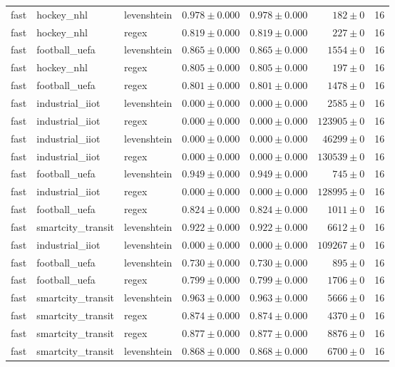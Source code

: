 \begin{table}[htbp]
\begin{tabular}{l l l r r r r}
fast & hockey\_nhl & levenshtein & $0.978\pm0.000$ & $0.978\pm0.000$ & $182\pm0$ & 16 \\
fast & hockey\_nhl & regex & $0.819\pm0.000$ & $0.819\pm0.000$ & $227\pm0$ & 16 \\
fast & football\_uefa & levenshtein & $0.865\pm0.000$ & $0.865\pm0.000$ & $1554\pm0$ & 16 \\
fast & hockey\_nhl & regex & $0.805\pm0.000$ & $0.805\pm0.000$ & $197\pm0$ & 16 \\
fast & football\_uefa & regex & $0.801\pm0.000$ & $0.801\pm0.000$ & $1478\pm0$ & 16 \\
fast & industrial\_iiot & levenshtein & $0.000\pm0.000$ & $0.000\pm0.000$ & $2585\pm0$ & 16 \\
fast & industrial\_iiot & regex & $0.000\pm0.000$ & $0.000\pm0.000$ & $123905\pm0$ & 16 \\
fast & industrial\_iiot & levenshtein & $0.000\pm0.000$ & $0.000\pm0.000$ & $46299\pm0$ & 16 \\
fast & industrial\_iiot & regex & $0.000\pm0.000$ & $0.000\pm0.000$ & $130539\pm0$ & 16 \\
fast & football\_uefa & levenshtein & $0.949\pm0.000$ & $0.949\pm0.000$ & $745\pm0$ & 16 \\
fast & industrial\_iiot & regex & $0.000\pm0.000$ & $0.000\pm0.000$ & $128995\pm0$ & 16 \\
fast & football\_uefa & regex & $0.824\pm0.000$ & $0.824\pm0.000$ & $1011\pm0$ & 16 \\
fast & smartcity\_transit & levenshtein & $0.922\pm0.000$ & $0.922\pm0.000$ & $6612\pm0$ & 16 \\
fast & industrial\_iiot & levenshtein & $0.000\pm0.000$ & $0.000\pm0.000$ & $109267\pm0$ & 16 \\
fast & football\_uefa & levenshtein & $0.730\pm0.000$ & $0.730\pm0.000$ & $895\pm0$ & 16 \\
fast & football\_uefa & regex & $0.799\pm0.000$ & $0.799\pm0.000$ & $1706\pm0$ & 16 \\
fast & smartcity\_transit & levenshtein & $0.963\pm0.000$ & $0.963\pm0.000$ & $5666\pm0$ & 16 \\
fast & smartcity\_transit & regex & $0.874\pm0.000$ & $0.874\pm0.000$ & $4370\pm0$ & 16 \\
fast & smartcity\_transit & regex & $0.877\pm0.000$ & $0.877\pm0.000$ & $8876\pm0$ & 16 \\
fast & smartcity\_transit & levenshtein & $0.868\pm0.000$ & $0.868\pm0.000$ & $6700\pm0$ & 16 \\

\end{tabular}
\end{table}
